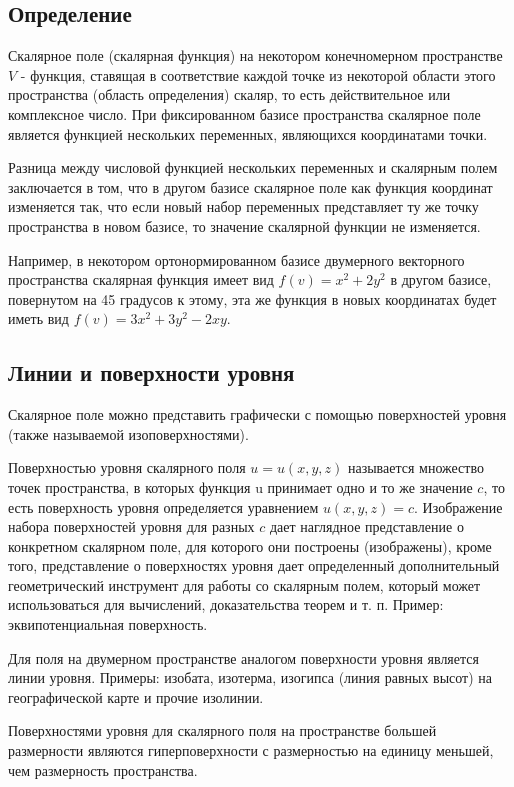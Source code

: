 
\subsection{Определение}
Скалярное поле (скалярная функция) на некотором конечномерном пространстве $V$ - функция, ставящая в соответствие каждой точке из некоторой области этого пространства (область определения) скаляр, то есть действительное или комплексное число. При фиксированном базисе пространства скалярное поле является функцией нескольких переменных, являющихся координатами точки.

Разница между числовой функцией нескольких переменных и скалярным полем заключается в том, что в другом базисе скалярное поле как функция координат изменяется так, что если новый набор переменных представляет ту же точку пространства в новом базисе, то значение скалярной функции не изменяется.

Например, в некотором ортонормированном базисе двумерного векторного пространства скалярная функция имеет вид $f(v)=x^{2}+2y^{2}$ в другом базисе, повернутом на 45 градусов к этому, эта же функция в новых координатах будет иметь вид $f(v)=3x^{2}+3y^{2}-2xy$.
\subsection{Линии и поверхности уровня}
Скалярное поле можно представить графически с помощью поверхностей уровня (также называемой изоповерхностями).

Поверхностью уровня скалярного поля $u=u(x,y,z)$ называется множество точек пространства, в которых функция u принимает одно и то же значение $c$, то есть поверхность уровня определяется уравнением $u(x,y,z)=c$. Изображение набора поверхностей уровня для разных $c$ дает наглядное представление о конкретном скалярном поле, для которого они построены (изображены), кроме того, представление о поверхностях уровня дает определенный дополнительный геометрический инструмент для работы со скалярным полем, который может использоваться для вычислений, доказательства теорем и т. п. Пример: эквипотенциальная поверхность.

Для поля на двумерном пространстве аналогом поверхности уровня является линии уровня. Примеры: изобата, изотерма, изогипса (линия равных высот) на географической карте и прочие изолинии.

Поверхностями уровня для скалярного поля на пространстве большей размерности являются гиперповерхности с размерностью на единицу меньшей, чем размерность пространства.

